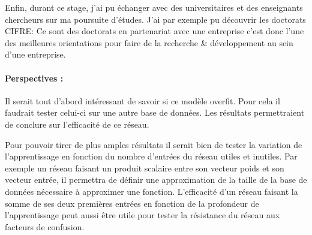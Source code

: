 Enfin, durant ce stage, j'ai pu échanger avec des universitaires et des enseignants chercheurs
sur ma poursuite d'études.
J'ai par exemple pu découvrir les doctorats \textsc{CIFRE}\cite{cifre}:
Ce sont des doctorats en partenariat avec une entreprise c'est donc l'une des meilleures
orientations pour faire de la recherche & développement au sein d'une entreprise.


\paragraph{Perspectives :\\}
Il serait tout d'abord intéressant de savoir si ce modèle overfit.
Pour cela il faudrait tester celui-ci sur une autre base de données.
Les résultats permettraient de conclure sur l'efficacité de ce réseau.


Pour pouvoir tirer de plus amples résultats il serait bien de tester la variation de
l'apprentissage en fonction du nombre d'entrées du réseau utiles et inutiles.
Par exemple un réseau faisant un produit scalaire entre son vecteur poids et son vecteur entrée,
il permettra de définir une approximation de la taille de la base de données nécessaire à approximer une fonction.
L'efficacité d'un réseau faisant la somme de ses deux premières entrées en fonction de la profondeur de l'apprentissage
peut aussi être utile pour tester la résistance du réseau aux facteurs de confusion.
